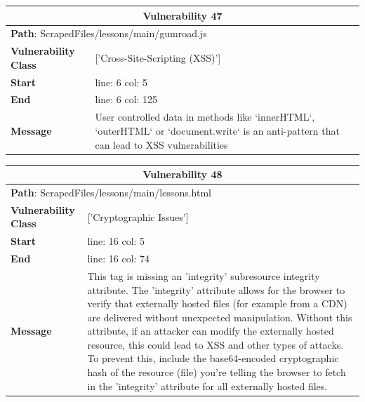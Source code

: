 \documentclass[12pt]{article}
\begin{document}
\begin{table}[!h]
\centering
\renewcommand{\arraystretch}{1.3}
\begin{tabular}{|l|p{10cm}|}
\hline
\multicolumn{2}{|c|}{\textbf{Vulnerability 47}} \\
\hline
\multicolumn{2}{|l|}{\textbf{Path}: ScrapedFiles/lessons/main/gumroad.js} \\
\hline
\textbf{Vulnerability Class} & ['Cross-Site-Scripting (XSS)'] \\
\hline
\textbf{Start} & line: 6 \quad col: 5 \\
\hline
\textbf{End} & line: 6 \quad col: 125 \\
\hline
\textbf{Message} & User controlled data in methods like `innerHTML`, `outerHTML` or `document.write` is an anti-pattern that can lead to XSS vulnerabilities \\
\hline
\end{tabular}
\end{table}
\vspace{0.7cm}
\FloatBarrier
\begin{table}[!h]
\centering
\renewcommand{\arraystretch}{1.3}
\begin{tabular}{|l|p{10cm}|}
\hline
\multicolumn{2}{|c|}{\textbf{Vulnerability 48}} \\
\hline
\multicolumn{2}{|l|}{\textbf{Path}: ScrapedFiles/lessons/main/lessons.html} \\
\hline
\textbf{Vulnerability Class} & ['Cryptographic Issues'] \\
\hline
\textbf{Start} & line: 16 \quad col: 5 \\
\hline
\textbf{End} & line: 16 \quad col: 74 \\
\hline
\textbf{Message} & This tag is missing an 'integrity' subresource integrity attribute. The 'integrity' attribute allows for the browser to verify that externally hosted files (for example from a CDN) are delivered without unexpected manipulation. Without this attribute, if an attacker can modify the externally hosted resource, this could lead to XSS and other types of attacks. To prevent this, include the base64-encoded cryptographic hash of the resource (file) you're telling the browser to fetch in the 'integrity' attribute for all externally hosted files. \\
\hline
\end{tabular}
\end{table}
\vspace{0.7cm}
\FloatBarrier
\end{document}
